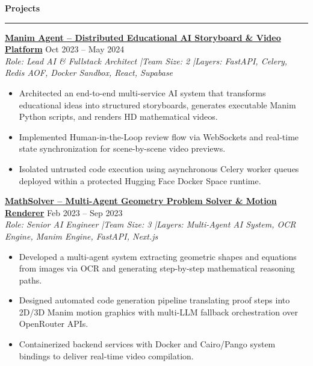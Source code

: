 \documentclass[10pt,a4paper]{article}
\newcommand{\sectionhr}[1]{%
  \vspace{0.4em}\noindent\textbf{\large #1}\par
  \vspace{0.2em}\hrule\vspace{0.4em}
}
\begin{document}
\sectionhr{Projects}

\href{https://github.com/nxc1802/Manim-Agent}{\textbf{Manim Agent -- Distributed Educational AI Storyboard \& Video Platform}} \hfill Oct 2023 -- May 2024 \\
\emph{Role: Lead AI \& Fullstack Architect \quad|\quad Team Size: 2 \quad|\quad Layers: FastAPI, Celery, Redis AOF, Docker Sandbox, React, Supabase}
\begin{itemize}
\item Architected an end-to-end multi-service AI system that transforms educational ideas into structured storyboards, generates executable Manim Python scripts, and renders HD mathematical videos.
\item Implemented Human-in-the-Loop review flow via WebSockets and real-time state synchronization for scene-by-scene video previews.
\item Isolated untrusted code execution using asynchronous Celery worker queues deployed within a protected Hugging Face Docker Space runtime.
\end{itemize}

\vspace{0.4em}
\href{https://github.com/nxc1802/MathSolver}{\textbf{MathSolver -- Multi-Agent Geometry Problem Solver \& Motion Renderer}} \hfill Feb 2023 -- Sep 2023 \\
\emph{Role: Senior AI Engineer \quad|\quad Team Size: 3 \quad|\quad Layers: Multi-Agent AI System, OCR Engine, Manim Engine, FastAPI, Next.js}
\begin{itemize}
\item Developed a multi-agent system extracting geometric shapes and equations from images via OCR and generating step-by-step mathematical reasoning paths.
\item Designed automated code generation pipeline translating proof steps into 2D/3D Manim motion graphics with multi-LLM fallback orchestration over OpenRouter APIs.
\item Containerized backend services with Docker and Cairo/Pango system bindings to deliver real-time video compilation.
\end{itemize}
\end{document}
